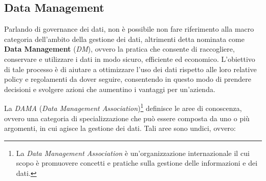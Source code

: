 \subsection{Data Management}

Parlando di governance dei dati, non è possibile non fare riferimento alla macro categoria dell'ambito della gestione dei dati, altrimenti detta nominata come \textbf{Data Management} (\textit{DM}), ovvero la pratica che consente di raccogliere, conservare e utilizzare i dati in modo sicuro, efficiente ed economico. L'obiettivo di tale processo è di aiutare a ottimizzare l'uso dei dati rispetto alle loro relative policy e regolamenti da dover seguire, consentendo in questo modo di prendere decisioni e svolgere azioni che aumentino i vantaggi per un'azienda.\cite{oracle_data_management}

La \textit{DAMA} (\textit{Data Management Association})\footnote{La \textit{Data Management Association} è un'organizzazione internazionale il cui scopo è promuovere concetti e pratiche sulla gestione delle informazioni e dei dati.} definisce le aree di conoscenza, ovvero una categoria di specializzazione che può essere composta da uno o più argomenti, in cui agisce la gestione dei dati. Tali aree sono undici, ovvero:\cite{academiaedu_dama_framework}
